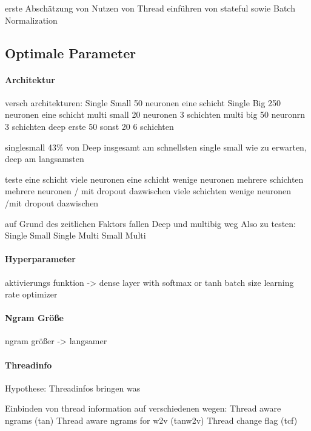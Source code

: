         erste Abschätzung von Nutzen von Thread 
        einführen von stateful sowie Batch Normalization

    \subsection{Optimale Parameter}

        \paragraph{Architektur}
            versch architekturen:
            Single Small 50 neuronen eine schicht
            Single Big 250 neuronen eine schicht
            multi small 20 neuronen 3 schichten
            multi big 50 neuronrn 3 schichten
            deep erste 50 sonst 20 6 schichten

            singlesmall 43\% von Deep
            insgesamt am schnellsten single small
            wie zu erwarten,  deep am langsamsten

            teste eine schicht viele neuronen 
            eine schicht wenige neuronen
            mehrere schichten mehrere neuronen / mit dropout dazwischen
            viele schichten wenige neuronen /mit dropout dazwischen

            auf Grund des zeitlichen Faktors fallen Deep und multibig weg
            Also zu testen:
            Single Small
            Single 
            Multi Small
            Multi 

        \paragraph{Hyperparameter}
            aktivierungs funktion
            -> dense layer with softmax or tanh
            batch size
            learning rate
            optimizer

        \paragraph{Ngram Größe}
            ngram größer -> langsamer

        \paragraph{Threadinfo}
            Hypothese:
            Threadinfos bringen was

            Einbinden von thread information auf verschiedenen wegen:
            Thread aware ngrams (tan)
            Thread aware ngrams for w2v (tanw2v)
            Thread change flag (tcf)

